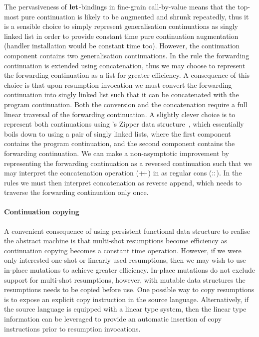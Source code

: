 \documentclass[12pt,phd,lfcs,twoside,openright,logo,leftchapter,normalheadings]{infthesis}
\theoremstyle{plain}
\theoremstyle{definition}
\begin{document}
The pervasiveness of $\mathbf{let}$-bindings in fine-grain call-by-value means
that the top-most pure continuation is likely to be augmented and
shrunk repeatedly, thus it is a sensible choice to simply represent
generalisation continuations as singly linked list in order to provide
constant time pure continuation augmentation (handler installation
would be constant time too). However, the continuation component
contains two generalisation continuations. In the rule 
the forwarding continuation is extended using concatenation, thus we
may choose to represent the forwarding continuation as a
\citeauthor{Hughes86} list for greater efficiency. A consequence of
this choice is that upon resumption invocation we must convert the
forwarding continuation into singly linked list such that it can be
concatenated with the program continuation. Both the conversion and
the concatenation require a full linear traversal of the forwarding
continuation.
%
A slightly clever choice is to represent both continuations using
\citeauthor{Huet97}'s Zipper data structure~\cite{Huet97}, which
essentially boils down to using a pair of singly linked lists, where
the first component contains the program continuation, and the second
component contains the forwarding continuation. We can make a
non-asymptotic improvement by representing the forwarding continuation
as a reversed continuation such that we may interpret the
concatenation operation ($\mathbin{+\!\!+}$) in  as regular cons
($::$). In the  rules we must then interpret
concatenation as reverse append, which needs to traverse the
forwarding continuation only once.

\paragraph{Continuation copying}
A convenient consequence of using persistent functional data structure
to realise the abstract machine is that multi-shot resumptions become
efficiency as continuation copying becomes a constant time
operation. However, if we were only interested one-shot or linearly
used resumptions, then we may wish to use in-place mutations to
achieve greater efficiency. In-place mutations do not exclude support
for multi-shot resumptions, however, with mutable data structures the
resumptions needs to be copied before use. One possible way to copy
resumptions is to expose an explicit copy instruction in the source
language. Alternatively, if the source language is equipped with a
linear type system, then the linear type information can be leveraged
to provide an automatic insertion of copy instructions prior to
resumption invocations.
\end{document}
